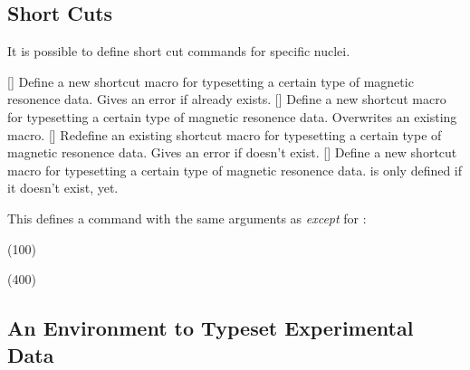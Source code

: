 \documentclass{chemmacros-manual}
\begin{document}
\subsection{Short Cuts}

It is possible to define short cut commands for specific nuclei.
\begin{commands}
  []
    Define a new shortcut macro for typesetting a certain type of magnetic
    resonence data.  Gives an error if  already exists.
  []
    Define a new shortcut macro for typesetting a certain type of magnetic
    resonence data.  Overwrites an existing macro.
  []
    Redefine an existing shortcut macro for typesetting a certain type of
    magnetic resonence data.  Gives an error if  doesn't exist.
  []
    Define a new shortcut macro for typesetting a certain type of magnetic
    resonence data.   is only defined if it doesn't exist, yet.
\end{commands}

This defines a command with the same arguments as  \emph{except} for
:
\begin{example}
  \NewChemNMR{}%
  \NewChemNMR{}%
  \CNMR*(100) \par
  \HNMR*(400)
\end{example}

\subsection{An Environment to Typeset Experimental Data}
\end{document}
